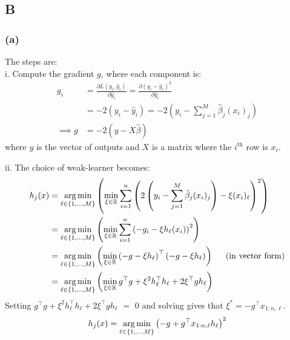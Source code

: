 \subsection{B}

\subsubsection{(a)}
The steps are:\\
i. Compute the gradient $g$, where each component is:
\begin{align}
    g_i &= \frac{\partial L(y_i,\hat{y}_i)}{\partial \hat{y}_i} =
    \frac{\partial (y_i - \hat{y}_i)^2}{\partial \hat{y}_i} \\
    &= -2(y_i - \hat{y}_i)
    = -2 \left( y_i - \sum_{j=1}^M \hat{\beta}_j (x_i)_j \right) \\
    \implies g &= -2 \left( y - X \hat{\beta} \right)
\end{align}
where $y$ is the vector of outputs and $X$ is a matrix where the $i^\text{th}$
row is $x_i$.

ii. The choice of weak-learner becomes:
\begin{align}
    h_j(x) &= \operatorname*{arg\,min}_{\ell \in \{1,\ldots,M\}} \left( \min_{\xi \in
    \mathbb{R}} \sum_{i=1}^n \left( 2 \left( y_i - \sum_{j=1}^M \hat{\beta}_j
    (x_i)_j \right) - \xi (x_i)_{\ell} \right)^2 \right) \\
    &= \operatorname*{arg\,min}_{\ell \in \{1,\ldots,M\}}  \left( \min_{\xi \in
    \mathbb{R}} \sum_{i=1}^n \left( -g_i - \xi h_{\ell}(x_i) \right)^2 \right) \\
    &= \operatorname*{arg\,min}_{\ell \in \{1,\ldots,M\}} \left( \min_{\xi \in \mathbb{R}} \left(-g -
    \xi h_{\ell}\right)^{\top} \left(-g - \xi h_{\ell}\right)\right) 
    \hspace{4mm}\text{ (in vector form)} \\
    &= \operatorname*{arg\,min}_{\ell \in \{1,\ldots,M\}} \left( \min_{\xi \in \mathbb{R}}
    g^{\top}g +\xi^2 h_{\ell}^{\top} h_{\ell} + 2 \xi^{\top}g h_{\ell}   \right)
\end{align}
Setting $g^{\top}g +\xi^2 h_{\ell}^{\top} h_{\ell} + 2 \xi^{\top}g h_{\ell}$
$=$ $0$ and solving gives that $\xi^* = -g^{\top} x_{1:n,\ell}$.
\begin{align}
    h_j(x) = \operatorname*{arg\,min}_{\ell \in \{1,\ldots,M\}} \left( -g + g^{\top}
    x_{1:n,\ell} h_{\ell} \right)^2
\end{align}

